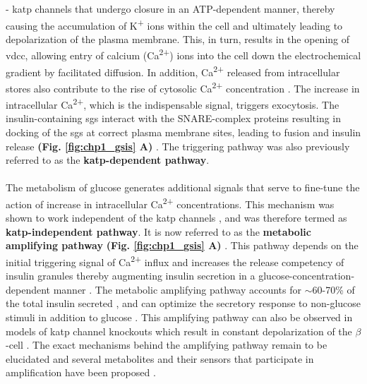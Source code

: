 - \gls{katp} channels that undergo closure in an ATP-dependent manner, thereby causing the accumulation of K\textsuperscript{+} ions within the cell and ultimately leading to depolarization of the plasma membrane. This, in turn, results in the opening of \gls{vdcc}, allowing entry of calcium (Ca\textsuperscript{2+}) ions into the cell down the electrochemical gradient by facilitated diffusion. In addition, Ca\textsuperscript{2+} released from intracellular stores also contribute to the rise of cytosolic Ca\textsuperscript{2+} concentration \textbf{\cite{yang_ionic_2014}}. The increase in intracellular Ca\textsuperscript{2+}, which is the indispensable signal, triggers exocytosis. The insulin-containing \glspl{sg} interact with the SNARE-complex proteins resulting in docking of the \glspl{sg} at correct plasma membrane sites, leading to fusion and insulin release \textbf{(Fig. \ref{fig:chp1_gsis} A)} \textbf{\cite{jewell_exocytosis_2010,chatterjee_bhowmick_conventional_2021}}.   %
The triggering pathway was also previously referred to as the \textbf{ \gls{katp}-dependent pathway}.
\\\\
The metabolism of glucose generates additional signals that serve to fine-tune the action of increase in intracellular Ca\textsuperscript{2+} concentrations. This mechanism was shown to work independent of the \gls{katp} channels \textbf{\cite{sato_dual_1992,gembal_evidence_1992}}, and was therefore termed as \textbf{\gls{katp}-independent pathway}. It is now referred to as the \textbf{metabolic amplifying pathway} \textbf{(Fig. \ref{fig:chp1_gsis} A)} \textbf{\cite{henquin_triggering_2000,henquin_pathways_2004,henquin_regulation_2009}}.  This pathway depends on the initial triggering signal of Ca\textsuperscript{2+} influx and increases the release competency of insulin granules thereby augmenting insulin secretion in a glucose-concentration-dependent manner \textbf{\cite{henquin_triggering_2000,kalwat_mechanisms_2017}}. The metabolic amplifying pathway accounts for $\sim$60-70\% of the total insulin secreted \textbf{\cite{henquin_regulation_2009}}, and can optimize the secretory response to non-glucose stimuli in addition to glucose \textbf{\cite{henquin_triggering_2000,kalwat_mechanisms_2017,zhao_-hydrolase_2015,tengholm_camp_2017,han_glutamate_2021}}. This amplifying pathway can also be observed in models of \gls{katp} channel knockouts which result in constant depolarization of the $\beta$-cell \textbf{\cite{nenquin_both_2004,miki_defective_1998,ravier_glucose_2009}}. The exact mechanisms behind the amplifying pathway remain to be elucidated and several metabolites and their sensors that participate in amplification have been proposed \textbf{\cite{kalwat_mechanisms_2017}}.%

